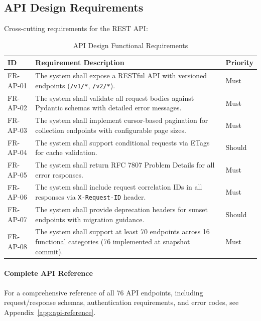 \documentclass[a4paper,twoside]{sapthesis}
\begin{document}
\subsection{API Design Requirements}
\label{subsec:fr-api}

Cross-cutting requirements for the REST API:

\begin{table}[htbp]
\centering
\caption{API Design Functional Requirements}
\label{tab:fr-api}
\small
\begin{tabularx}{\textwidth}{|l|X|l|}
\hline
\textbf{ID} & \textbf{Requirement Description} & \textbf{Priority} \\
\midrule
FR-AP-01 & The system shall expose a RESTful API with versioned endpoints (\texttt{/v1/*}, \texttt{/v2/*}). & Must \\
\midrule
FR-AP-02 & The system shall validate all request bodies against Pydantic schemas with detailed error messages. & Must \\
\midrule
FR-AP-03 & The system shall implement cursor-based pagination for collection endpoints with configurable page sizes. & Must \\
\midrule
FR-AP-04 & The system shall support conditional requests via ETags for cache validation. & Should \\
\midrule
FR-AP-05 & The system shall return RFC 7807 Problem Details for all error responses. & Must \\
\midrule
FR-AP-06 & The system shall include request correlation IDs in all responses via \texttt{X-Request-ID} header. & Must \\
\midrule
FR-AP-07 & The system shall provide deprecation headers for sunset endpoints with migration guidance. & Should \\
\midrule
FR-AP-08 & The system shall support at least 70 endpoints across 16 functional categories (76 implemented at snapshot commit). & Must \\
\midrule
\end{tabularx}
\end{table}

\paragraph{Complete API Reference}
For a comprehensive reference of all 76 API endpoints, including request/response schemas, authentication requirements, and error codes, see Appendix~\ref{app:api-reference}.
\end{document}
